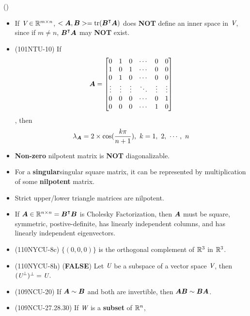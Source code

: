 \begin{theorem}{()}
\begin{itemize}
        \item If $\textit{V} \in \mathbb{R}^{m \times n}$, $<\boldsymbol{A}, \boldsymbol{B}> = \operatorname{tr}(\boldsymbol{B}^\intercal\boldsymbol{A})$ does \textbf{NOT} define an inner space in $\textit{V}$, since if $m \neq n$, $\boldsymbol{B}^\intercal\boldsymbol{A}$ may \textbf{NOT} exist.
        \item (101NTU-10) If \begin{equation}
            \boldsymbol{A} = 
            \begin{bmatrix} 
				0 & 1 & 0 & \cdots & 0 & 0 \\
                1 & 0 & 1 & \cdots & 0 & 0 \\
                0 & 1 & 0 & \cdots & 0 & 0 \\
                \vdots & \vdots & \vdots & \ddots & \vdots & \vdots \\
                0 & 0 & 0 & \cdots & 0 & 1 \\
                0 & 0 & 0 & \cdots & 1 & 0
			\end{bmatrix}
        \end{equation}, then \begin{equation}
            \lambda_{\boldsymbol{A}} = 2 \times \cos(\frac{k\pi}{n + 1}), \ k = 1,\ 2, \ \cdots, \ n
        \end{equation}
        \item \textbf{Non-zero} nilpotent matrix is \textbf{NOT} diagonalizable.
        \item For a \textbf{singular}{singular} square matrix, it can be represented by multiplication of some \textbf{nilpotent} matrix.
        \item Strict upper/lower triangle matrices are nilpotent.
        \item If $\boldsymbol{A} \in \mathbb{R}^{n \times n} = \boldsymbol{B}^\intercal\boldsymbol{B}$ is Cholesky Factorization, then $\boldsymbol{A}$ must be square, symmetric, postive-definite, has linearly independent columns, and has linearly independent eigenvectors. 
        \item (110NYCU-8c) $\{(0, 0, 0)\}$ is the orthogonal complement of $\mathbb{R}^3$ in $\mathbb{R}^3$.
        \item (110NYCU-8h) (\textbf{FALSE}) Let $\textit{U}$ be a subspace of a vector space $\textit{V}$, then $(\textit{U}^{\bot})^{\bot} = \textit{U}$.
        \item (109NCU-20) If $\boldsymbol{A} \sim \boldsymbol{B}$ and both are invertible, then $\boldsymbol{A}\boldsymbol{B} \sim \boldsymbol{B}\boldsymbol{A}$.
        \item (109NCU-27.28.30) If $\textit{W}$ is a \textbf{subset} of $\mathbb{R}^n$, \begin{itemize}

\end{itemize}
\end{itemize}
\end{theorem}
